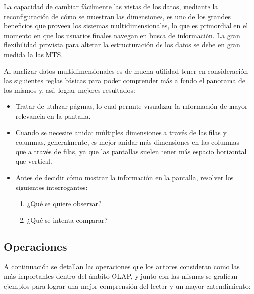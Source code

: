 \documentclass[a4paper,11pt]{article}
\begin{document}
\begin{flushleft}
    
    La capacidad de cambiar fácilmente las vistas de los datos, mediante la reconfiguración de cómo se muestran las dimensiones, es uno de los grandes beneficios
    que proveen los sistemas multidimensionales, lo que es primordial en el momento en que los usuarios finales navegan en busca de información. La gran
    flexibilidad provista para alterar la estructuración de los datos se debe en gran medida la las MTS.\par
    
    \vspace{0.2in}
    Al analizar datos multidimensionales es de mucha utilidad tener en consideración las siguientes reglas básicas para poder comprender más a fondo el panorama
    de los mismos y, así, lograr mejores resultados:
    
    \begin{itemize}
      \item Tratar de utilizar páginas, lo cual permite visualizar la información de mayor relevancia en la pantalla.
      \item Cuando se necesite anidar múltiples dimensiones a través de las filas y columnas, generalmente, es mejor anidar más dimensiones en las columnas que
      a través de filas, ya que las pantallas suelen tener más espacio horizontal que vertical.
      \item Antes de decidir cómo mostrar la información en la pantalla, resolver los siguientes interrogantes:
        \begin{enumerate}
          \item ¿Qué se quiere observar?
          \item ¿Qué se intenta comparar?
        \end{enumerate}
    \end{itemize}
    
    
    \subsection{Operaciones}
    
    A continuación se detallan las operaciones que los autores consideran como las más importantes dentro del ámbito OLAP, y junto con las mismas se grafican
    ejemplos para lograr una mejor comprensión del lector y un mayor entendimiento:
    

\end{flushleft}
\end{document}
